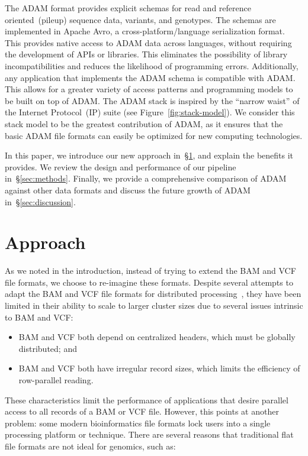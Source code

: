 \documentclass{bioinfo}
\begin{document}
The ADAM format provides explicit schemas for read and reference oriented~(pileup) sequence data, variants, and genotypes. The schemas are implemented in Apache
Avro, a cross-platform/language serialization format. This provides native access to ADAM data across languages, without requiring the development of APIs or libraries.
This eliminates the possibility of library incompatibilities and reduces the likelihood of programming errors. Additionally, any application that implements the
ADAM schema is compatible with ADAM. This allows for a greater variety of access patterns and programming models to be built on top of ADAM. The ADAM stack is inspired
by the ``narrow waist'' of the Internet Protocol~(IP) suite (see Figure~\ref{fig:stack-model}). We consider this stack model to be the greatest contribution of ADAM, as it ensures
that the basic ADAM file formats can easily be optimized for new computing technologies.

In this paper, we introduce our new approach in~\S\ref{sec:approach}, and explain the benefits it provides. We review the design and performance of our pipeline
in~\S\ref{sec:methods}. Finally, we provide a comprehensive comparison of ADAM against other data formats and discuss the future growth of ADAM in~\S\ref{sec:discussion}.

\section{Approach}
\label{sec:approach}

As we noted in the introduction, instead of trying to extend the BAM and VCF file formats, we choose to re-imagine these formats. Despite several attempts to adapt the
BAM and VCF file formats for distributed processing~\citep[see][]{niemenmaa12}, they have been limited in their ability to scale to larger cluster sizes due to several issues
intrinsic to BAM and VCF:

\begin{itemize}
\item BAM and VCF both depend on centralized headers, which must be globally distributed; and
\item BAM and VCF both have irregular record sizes, which limits the efficiency of row-parallel reading. 
\end{itemize}

These characteristics limit the performance of applications that desire parallel access to all records of a BAM or VCF file. However,
this points at another problem: some modern bioinformatics file formats lock users into a single processing platform or technique. There are
several reasons that traditional flat file formats are not ideal for genomics, such as:
\end{document}
